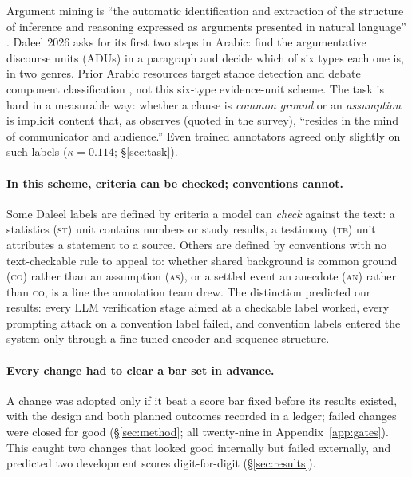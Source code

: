 \documentclass[11pt]{article}
\newcommand{\lab}[1]{\textsc{#1}}
\newcommand{\co}{\lab{co}}
\newcommand{\as}{\lab{as}}
\newcommand{\te}{\lab{te}}
\newcommand{\st}{\lab{st}}
\newcommand{\an}{\lab{an}}
\begin{document}
Argument mining is ``the automatic identification and extraction of the
structure of inference and reasoning expressed as arguments presented in
natural language'' \citep{lawrence-reed-2019-argument}. Daleel 2026
\citep{nabhani-etal-2026-daleel} asks for its first two steps
\citep{peldszus-stede-2013-argument} in Arabic: find the argumentative
discourse units (ADUs) in a paragraph and decide which of six types
each one is, in two genres. Prior Arabic resources target stance
detection
\citep{alhindi-etal-2021-arastance,alturayeif-etal-2022-mawqif} and
debate component classification
\citep{khader-etal-2024-munazarat,alzawqari-etal-2025-neural}, not this
six-type evidence-unit scheme. The task is hard in a measurable way:
whether a clause is \emph{common ground} or an \emph{assumption} is
implicit content that, as \citet{moens-2018-argumentation} observes
(quoted in the survey), ``resides in the mind of communicator and
audience.'' Even trained annotators agreed only slightly on such labels
($\kappa{=}0.114$; \S\ref{sec:task}).

\paragraph{In this scheme, criteria can be checked; conventions cannot.} Some Daleel
labels are defined by criteria a model can \emph{check} against the text:
a statistics (\st) unit contains numbers or study results, a testimony
(\te) unit attributes a statement to a source. Others are defined by
conventions with no text-checkable rule to appeal to: whether shared
background is common ground (\co) rather than an assumption (\as), or a
settled event an anecdote (\an) rather than \co, is a line the
annotation team drew. The distinction predicted our results: every
LLM verification stage aimed at a checkable label worked, every
prompting attack on a convention label failed, and convention labels
entered the system only through a fine-tuned encoder and sequence
structure.

\paragraph{Every change had to clear a bar set in advance.} A change
was adopted only if it beat a score bar fixed before its results
existed, with the design and both planned outcomes recorded in a
ledger; failed changes were closed for good (\S\ref{sec:method}; all
twenty-nine in Appendix~\ref{app:gates}). This caught two changes that
looked good internally but failed externally, and predicted two
development scores digit-for-digit (\S\ref{sec:results}).
\end{document}
